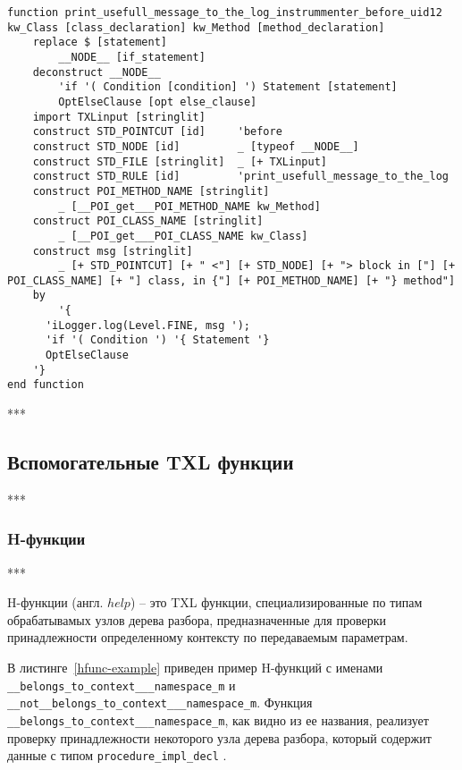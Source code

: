 \begin{lstlisting}[frame=single, language=TXL, label={ifunc-example}, caption={Пример I-функции}]
function print_usefull_message_to_the_log_instrummenter_before_uid12 kw_Class [class_declaration] kw_Method [method_declaration]
	replace $ [statement]
		__NODE__ [if_statement]
	deconstruct __NODE__
		'if '( Condition [condition] ') Statement [statement]
		OptElseClause [opt else_clause]
	import TXLinput [stringlit]
	construct STD_POINTCUT [id]	    'before
	construct STD_NODE [id]	        _ [typeof __NODE__]
	construct STD_FILE [stringlit]  _ [+ TXLinput]
	construct STD_RULE [id]         'print_usefull_message_to_the_log
	construct POI_METHOD_NAME [stringlit]
		_ [__POI_get___POI_METHOD_NAME kw_Method]
	construct POI_CLASS_NAME [stringlit]
		_ [__POI_get___POI_CLASS_NAME kw_Class]
	construct msg [stringlit]
		_ [+ STD_POINTCUT] [+ " <"] [+ STD_NODE] [+ "> block in ["] [+ POI_CLASS_NAME] [+ "] class, in {"] [+ POI_METHOD_NAME] [+ "} method"]
	by
		'{
      'iLogger.log(Level.FINE, msg ');
      'if '( Condition ') '{ Statement '}
      OptElseClause
    '}
end function
\end{lstlisting}

***

\subsection{Вспомогательные TXL функции}

***

\subsubsection{H-функции}

***

H-функции (англ. $help$) -- это TXL функции, специализированные по типам обрабатывамых узлов дерева разбора, предназначенные для проверки принадлежности определенному контексту по передаваемым параметрам.

В листинге~\ref{hfunc-example} приведен пример H-функций с именами \lstinline{__belongs_to_context___namespace_m} и \lstinline{__not__belongs_to_context___namespace_m}.
Функция \lstinline{__belongs_to_context___namespace_m}, как видно из ее названия, реализует проверку принадлежности некоторого узла дерева разбора, который содержит данные с типом \lstinline{procedure_impl_decl} .

